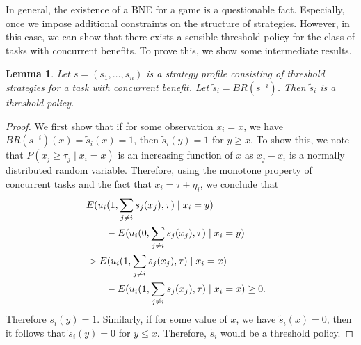 \documentclass[conference]{ieeeconf}
\newtheorem{lemma}{Lemma}
\begin{document}
In general, the existence of a BNE for a game is a questionable fact. Especially, once we impose additional constraints on the structure of strategies. However, in this case, we can show that there exists a sensible threshold policy for the class of tasks with concurrent benefits. To prove this, we show some intermediate results. 
\begin{lemma}\label{lemma:thresholdBR}
Let $s=(s_1,\ldots,s_n)$ is a strategy profile consisting of threshold strategies for a task with concurrent benefit. Let $\tilde{s}_i=BR(s^{-i})$. Then $\tilde{s}_i$ is a threshold policy. 
\end{lemma}
\begin{proof}
We first show that if for some observation $x_i=x$, we have $BR(s^{-i})(x)=\tilde{s}_i(x)=1$, then $\tilde{s}_i(y)=1$ for $y\geq x$. To show this,  we note that $P(x_j\geq \tau_j\mid x_i=x)$ is an increasing function of $x$ as $x_j-x_i$ is a normally distributed random variable. Therefore, using the monotone property of concurrent tasks and the fact that $x_i=\tau+\eta_i$, we conclude that 
\begin{align*}
&E(u_i(1,\sum_{j\not=i}s_j(x_j),\tau)\mid x_i=y)\cr 
&\qquad-E(u_i(0,\sum_{j\not=i}s_j(x_j),\tau)\mid x_i=y)\cr 
&>E(u_i(1,\sum_{j\not=i}s_j(x_j),\tau)\mid x_i=x)\cr
&\qquad-E(u_i(1,\sum_{j\not=i}s_j(x_j),\tau)\mid x_i=x)\geq 0.
\end{align*}
Therefore $\tilde{s}_i(y)=1$. Similarly, if for some value of $x$, we have $\tilde{s}_i(x)=0$, then it follows that $\tilde{s}_i(y)=0$ for $y\leq x$. Therefore, $\tilde{s}_i$ would be a threshold policy.  
\end{proof}
\end{document}
